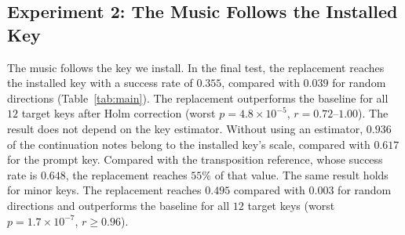 \documentclass{article}
\begin{document}
\subsection{Experiment 2: The Music Follows the Installed Key}
\label{sec:h3}
The music follows the key we install.
In the final test, the replacement reaches the installed key with a success rate of $0.355$, compared with $0.039$ for random directions (Table~\ref{tab:main}).
The replacement outperforms the baseline for all $12$ target keys after Holm correction (worst $p=4.8\times10^{-5}$, $r=0.72$--$1.00$).
The result does not depend on the key estimator.
Without using an estimator, $0.936$ of the continuation notes belong to the installed key's scale, compared with $0.617$ for the prompt key.
Compared with the transposition reference, whose success rate is $0.648$, the replacement reaches $55\%$ of that value.
The same result holds for minor keys.
The replacement reaches $0.495$ compared with $0.003$ for random directions and outperforms the baseline for all $12$ target keys (worst $p=1.7\times10^{-7}$, $r\ge0.96$).
\end{document}
